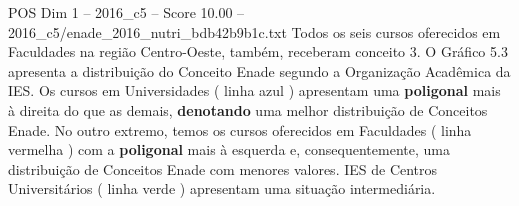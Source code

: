 \begin{textsample}{POS Dim 1 – 2016\_c5 – Score 10.00 – 2016\_c5/enade\_2016\_nutri\_bdb42b9b1c.txt}
Todos os seis cursos oferecidos em Faculdades na região Centro-Oeste, também, receberam conceito 3.
O Gráfico 5.3 apresenta a distribuição do Conceito Enade segundo a Organização Acadêmica da IES.
Os cursos em Universidades ( linha azul ) apresentam uma \textbf{poligonal} mais à direita do que as demais, \textbf{denotando} uma melhor distribuição de Conceitos Enade.
No outro extremo, temos os cursos oferecidos em Faculdades ( linha vermelha ) com a \textbf{poligonal} mais à esquerda e, consequentemente, uma distribuição de Conceitos Enade com menores valores.
IES de Centros Universitários ( linha verde ) apresentam uma situação intermediária.

\end{textsample}
